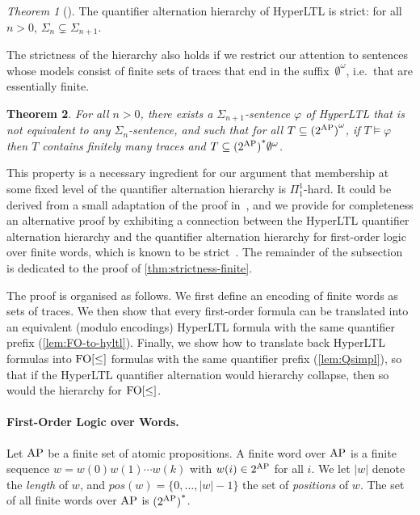 \documentclass[dvipsnames,10pt,a4paper]{amsart}
\newtheorem{thm}{Theorem}[section]
\theoremstyle{definition}
\theoremstyle{remark}
\newtheorem{thmC}[thm]{Theorem}
\newcommand{\hyltl}{{HyperLTL}\xspace}
\newcommand\FO{\textup{FO}}
\newcommand\AP{\textup{AP}}
\newcommand\FOw{\FO[\le]}
\newcommand\pos{\textit{pos}}
\begin{document}
\begin{thmC}[{\cite[Corollary 5.6.5]{Rabe16}}]
  The quantifier alternation hierarchy of \hyltl is strict:
  for all $n > 0$, $\Sigma_n \subsetneq \Sigma_{n+1}$.
\end{thmC}

The strictness of the hierarchy also holds if we restrict our attention to
sentences whose models consist of finite sets of traces that end in the suffix~$\emptyset^\omega$, i.e.\ that are essentially finite.

\begin{thm}\label{thm:strictness-finite}
  For all $n > 0$, there exists a $\Sigma_{n+1}$-sentence $\varphi$ of \hyltl
  that is not equivalent to any $\Sigma_{n}$-sentence, and such that for all
  $T \subseteq {(2^{\AP})}^\omega$, if $T \models \varphi$ then $T$ contains
  finitely many traces and $T \subseteq {(2^{\AP})}^\ast\emptyset^\omega$.
\end{thm}

This property 
is a necessary ingredient for our argument that membership
at some fixed level of the quantifier alternation hierarchy is $\Pi_1^1$-hard.
It could be derived from a small adaptation of the proof in~\cite{Rabe16},
and we provide for completeness an alternative proof by exhibiting a connection between the \hyltl quantifier alternation hierarchy and the quantifier alternation hierarchy for first-order logic over finite
words, which is known to be strict~\cite{CohenB71,Thomas82}.
The remainder of the subsection is dedicated to the proof of \autoref{thm:strictness-finite}.

The proof is organised as follows. We first define an encoding of finite words
as sets of traces. We then show that every first-order formula can be
translated into an equivalent (modulo encodings) \hyltl formula with the
same quantifier prefix (\autoref{lem:FO-to-hyltl}).
Finally, we show how to translate back \hyltl formulas into $\FOw$ formulas
with the same quantifier prefix (\autoref{lem:Qsimpl}), so that if the \hyltl quantifier alternation would
hierarchy collapse, then so would the hierarchy for $\FOw$.

\paragraph{First-Order Logic over Words.}
Let $\AP$ be a finite set of atomic propositions. A finite word over $\AP$
is a finite sequence $w = w(0)w(1) \cdots w(k)$ with $w(i) \in 2^\AP$ for all
$i$. We let $|w|$ denote the \emph{length} of $w$, and
$\pos(w) = \{0,\ldots,|w|-1\}$ the set of \emph{positions} of $w$.
The set of all finite words over $\AP$ is ${(2^\AP)}^\ast$.
\end{document}

